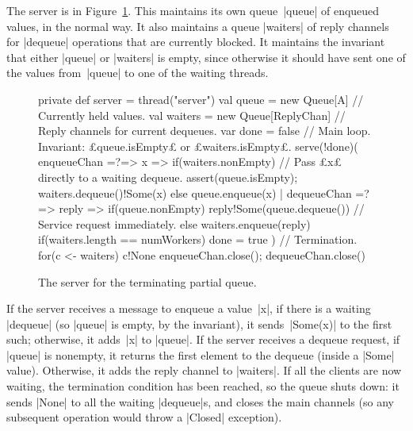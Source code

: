 

The server is in Figure~\ref{fig:terminating-queue-server}.  This maintains
its own queue~|queue| of enqueued values, in the normal way.  It also
maintains a queue |waiters| of reply channels for |dequeue| operations that
are currently blocked.  It maintains the invariant that either |queue| or
|waiters| is empty, since otherwise it should have sent one of the values
from~|queue| to one of the waiting threads.  


\begin{figure}
\begin{scala}
  private def server = thread("server"){
    val queue = new Queue[A] // Currently held values.
    val waiters = new Queue[ReplyChan] // Reply channels for current dequeues.
    var done = false
    // Main loop.  Invariant: £queue.isEmpty£ or £waiters.isEmpty£.
    serve(!done)(
      enqueueChan =?=> { x => 
        if(waiters.nonEmpty){ // Pass £x£ directly to a waiting dequeue.
          assert(queue.isEmpty); waiters.dequeue()!Some(x)
        }
        else queue.enqueue(x)
      }
      | dequeueChan =?=> { reply =>
          if(queue.nonEmpty)
            reply!Some(queue.dequeue()) // Service request immediately.
          else{
            waiters.enqueue(reply)
            if(waiters.length == numWorkers) done = true
          }
        }
    )
    // Termination.
    for(c <- waiters) c!None
    enqueueChan.close(); dequeueChan.close()
  }
\end{scala}
\caption{The server for the terminating partial queue.}
\label{fig:terminating-queue-server}
\end{figure}



If the server receives a message to enqueue a value~|x|, if there is a waiting
|dequeue| (so |queue| is empty, by the invariant), it sends~|Some(x)| to the
first such; otherwise, it adds~|x| to |queue|.  If the server receives a
dequeue request, if |queue| is nonempty, it returns the first element to the
dequeue (inside a |Some| value).  Otherwise, it adds the reply channel to
|waiters|.  If all the clients are now waiting, the termination condition has
been reached, so the queue shuts down: it sends |None| to all the waiting
|dequeue|s, and closes the main channels (so any subsequent operation would
throw a |Closed| exception).

